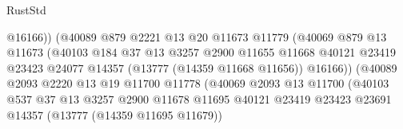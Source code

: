 \begin{lexlean}{RustStd}
\begin{coremodule}
                                          @16166))
                                      (@40089
                                        @879
                                        @2221
                                        @13
                                        @20
                                        @11673
                                        @11779
                                        (@40069
                                          @879
                                          @13
                                          @11673
                                          (@40103
                                            @184
                                            @37
                                            @13
                                            @3257
                                            @2900
                                            @11655
                                            @11668
                                            @40121
                                            @23419
                                            @23423
                                            @24077
                                            @14357
                                            (@13777 (@14359 @11668 @11656))
                                            @16166))
                                        (@40089
                                          @2093
                                          @2220
                                          @13
                                          @19
                                          @11700
                                          @11778
                                          (@40069
                                            @2093
                                            @13
                                            @11700
                                            (@40103
                                              @537
                                              @37
                                              @13
                                              @3257
                                              @2900
                                              @11678
                                              @11695
                                              @40121
                                              @23419
                                              @23423
                                              @23691
                                              @14357
                                              (@13777 (@14359 @11695 @11679))

\end{coremodule}
\end{lexlean}
